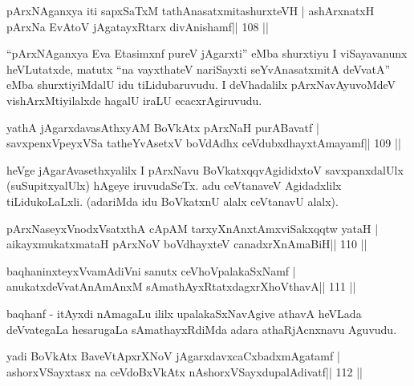 
\begin{shl}
pArxNAganxya iti sapxSaTxM tathA\s nasatxmitashurxteVH |
ashArxnatxH pArxNa EvAtoV jAgatayxRtarx divAnishamf\hfill || 108 ||
\end{shl}

\begin{artha}
``pArxNAganxya Eva Etasimxnf pureV jAgarxti'' eMba shurxtiyu I 
viSayavanunx heVLutatxde, matutx ``na vayxthateV nariSayxti seYvAnasatxmitA deVvatA'' eMba shurxtiyiMdalU idu tiLidubaruvudu. I deVhadalilx pArxNavAyuvoMdeV vishArxMtiyilalxde hagalU iraLU ecacxrAgiruvudu.
\end{artha} 

\begin{shl}
yathA jAgarxdavasAthxyAM BoVkAtx pArxNaH purA\s Bavatf |
savxpenxV\s peyxVSa tatheYvA\s\s setxV boVdAdhx ceVdubxdhayxtAmayamf\hfill || 109 ||
\end{shl}

\begin{artha}
heVge jAgarAvasethxyalilx I pArxNavu BoVkatxqqvAgididxtoV  savxpanxdalUlx (suSupitxyalUlx) hAgeye iruvudaSeTx. adu ceVtanaveV  Agidadxlilx tiLidukoLaLxli. (adariMda idu BoVkatxnU alalx ceVtanavU alalx).
\end{artha}


\begin{shl}
pArxNaseyxVnodxVsatxthA cApAM tarxyXnAnxtAmxviSakxqqtw yataH |
aikayxmukatxmataH pArxNoV boVdhayxteV canadxrXnAmaBiH\hfill || 110 ||
\end{shl}

\begin{shl}
baqhaninxteyxVvamAdiVni sanutx ceVhoVpalakaSxNamf |
anukatxdeVvatAnAmAnxM sAmathAyxRtatxdagxrXhoV\s thavA\hfill || 111 ||
\end{shl}

\begin{artha}
baqhanf - itAyxdi nAmagaLu ililx upalakaSxNavAgive athavA heVLada deVvategaLa hesarugaLa sAmathayxRdiMda adara athaRjAcnxnavu Aguvudu.
\end{artha}

\begin{shl}
yadi BoVkAtx BaveVtApxrXNoV jAgarxdavxcaCxbadxmAgatamf |
ashorxVSayxtasx na ceVdoBxVkAtx nAshorxVSayxdupalAdivatf\hfill || 112 ||
\end{shl}

